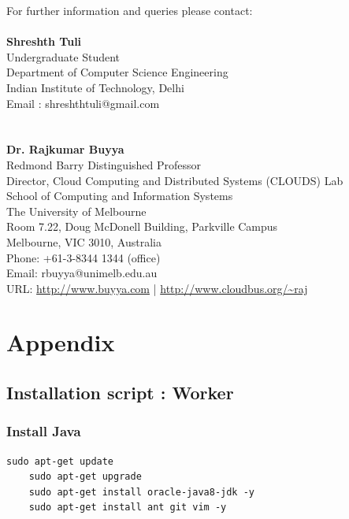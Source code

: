\documentclass{article}
\begin{document}
For further information and queries please contact:
\\ \\
\textbf{Shreshth Tuli}\\  
Undergraduate Student \\
Department of Computer Science Engineering \\
Indian Institute of Technology, Delhi \\
Email : shreshthtuli@gmail.com \\
\\ \\
\textbf{Dr. Rajkumar Buyya}\\
Redmond Barry Distinguished Professor \\
Director, Cloud Computing and Distributed Systems (CLOUDS) Lab\\
School of Computing and Information Systems\\
The University of Melbourne\\
Room 7.22, Doug McDonell Building, Parkville Campus\\
Melbourne, VIC 3010, Australia\\
Phone: +61-3-8344 1344 (office)\\
Email: rbuyya@unimelb.edu.au \\
URL: \url{http://www.buyya.com} | \url{http://www.cloudbus.org/~raj}

\newpage

\section*{Appendix}

\subsection*{Installation script : Worker}

\subsubsection*{Install Java}
\begin{lstlisting}[style=BashInputStyle]
    sudo apt-get update
    sudo apt-get upgrade
    sudo apt-get install oracle-java8-jdk -y
    sudo apt-get install ant git vim -y
\end{lstlisting}
\end{document}

